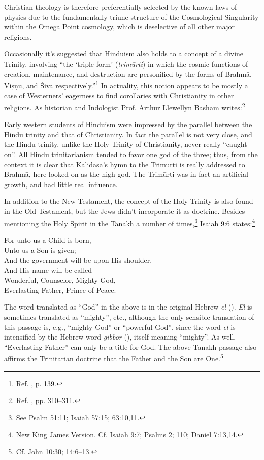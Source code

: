 \documentclass[letterpaper,12pt]{article}
\newenvironment{squote}
  {\small\quote}
  {\endquote\normalsize}
\newenvironment{sverse}
  {\small\verse}
  {\endverse\normalsize}
\begin{document}
Christian theology is therefore preferentially selected by the known laws of physics due to the fundamentally triune structure of the Cosmological Singularity within the Omega Point cosmology, which is deselective of all other major religions.

Occasionally it's suggested that Hinduism also holds to a concept of a divine Trinity, involving ``the `triple form' (\emph{trim\={u}rti}) in which the cosmic functions of creation, maintenance, and destruction are personified by the forms of Brahm\={a}, Vi\d{s}\d{n}u, and \'{S}iva respectively.''\footnote{Ref. , p. 139.} In actuality, this notion appears to be mostly a case of Westerners' eagerness to find corollaries with Christianity in other religions. As historian and Indologist Prof. Arthur Llewellyn Basham writes:\footnote{Ref. , pp. 310--311.}

\begin{squote}
Early western students of Hinduism were impressed by the parallel between the Hindu trinity and that of Christianity. In fact the parallel is not very close, and the Hindu trinity, unlike the Holy Trinity of Christianity, never really ``caught on''. All Hindu trinitarianism tended to favor one god of the three; thus, from the context it is clear that K\={a}lid\={a}sa's hymn to the Trim\={u}rti is really addressed to Brahm\={a}, here looked on as the high god. The Trim\={u}rti was in fact an artificial growth, and had little real influence.
\end{squote}

In addition to the New Testament, the concept of the Holy Trinity is also found in the Old Testament, but the Jews didn't incorporate it as doctrine. Besides mentioning the Holy Spirit in the Tanakh a number of times,\footnote{See Psalm 51:11; Isaiah 57:15; 63:10,11.} Isaiah 9:6 states:\footnote{New King James Version. Cf. Isaiah 9:7; Psalms 2; 110; Daniel 7:13,14.}

\begin{sverse}
For unto us a Child is born,\\
Unto us a Son is given;\\
And the government will be upon His shoulder.\\
And His name will be called\\
Wonderful, Counselor, Mighty God,\\
Everlasting Father, Prince of Peace.
\end{sverse}

The word translated as ``God'' in the above is in the original Hebrew \emph{el} (). \emph{El} is sometimes translated as ``mighty'', etc., although the only sensible translation of this passage is, e.g., ``mighty God'' or ``powerful God'', since the word \emph{el} is intensified by the Hebrew word \emph{gibbor} (), itself meaning ``mighty''. As well, ``Everlasting Father'' can only be a title for God. The above Tanakh passage also affirms the Trinitarian doctrine that the Father and the Son are One.\footnote{Cf. John 10:30; 14:6--13.}
\end{document}

